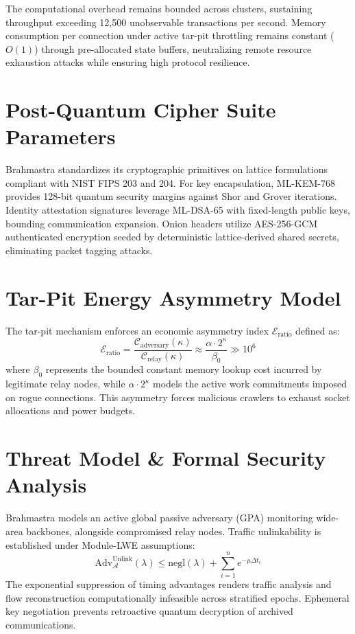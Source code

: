 \documentclass[conference,leqno]{IEEEtran}
\begin{document}
The computational overhead remains bounded across clusters, sustaining throughput exceeding 12,500 unobservable transactions per second. Memory consumption per connection under active tar-pit throttling remains constant ($O(1)$) through pre-allocated state buffers, neutralizing remote resource exhaustion attacks while ensuring high protocol resilience.

\section{Post-Quantum Cipher Suite Parameters}
Brahmastra standardizes its cryptographic primitives on lattice formulations compliant with NIST FIPS 203 and 204. For key encapsulation, ML-KEM-768 provides 128-bit quantum security margins against Shor and Grover iterations. Identity attestation signatures leverage ML-DSA-65 with fixed-length public keys, bounding communication expansion. Onion headers utilize AES-256-GCM authenticated encryption seeded by deterministic lattice-derived shared secrets, eliminating packet tagging attacks.

\section{Tar-Pit Energy Asymmetry Model}
The tar-pit mechanism enforces an economic asymmetry index $\mathcal{E}_{\text{ratio}}$ defined as:
\begin{equation}
\mathcal{E}_{\text{ratio}} = \frac{\mathcal{C}_{\text{adversary}}(\kappa)}{\mathcal{C}_{\text{relay}}(\kappa)} \approx \frac{\alpha \cdot 2^\kappa}{\beta_0} \gg 10^6
\end{equation}
where $\beta_0$ represents the bounded constant memory lookup cost incurred by legitimate relay nodes, while $\alpha \cdot 2^\kappa$ models the active work commitments imposed on rogue connections. This asymmetry forces malicious crawlers to exhaust socket allocations and power budgets.

\section{Threat Model \& Formal Security Analysis}
Brahmastra models an active global passive adversary (GPA) monitoring wide-area backbones, alongside compromised relay nodes. Traffic unlinkability is established under Module-LWE assumptions:
\begin{equation}
\mathrm{Adv}_{\mathcal{A}}^{\mathrm{Unlink}}(\lambda) \le \mathrm{negl}(\lambda) + \sum_{i=1}^n e^{-\mu \Delta t_i}
\end{equation}
The exponential suppression of timing advantages renders traffic analysis and flow reconstruction computationally infeasible across stratified epochs. Ephemeral key negotiation prevents retroactive quantum decryption of archived communications.
\end{document}
